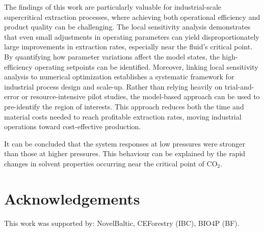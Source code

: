 \documentclass[a4paper,fleqn]{cas-dc}
\begin{document}
	{\color{blue}The findings of this work are particularly valuable for industrial-scale supercritical extraction processes, where achieving both operational efficiency and product quality can be challenging. The local sensitivity analysis demonstrates that even small adjustments in operating parameters can yield disproportionately large improvements in extraction rates, especially near the fluid’s critical point. By quantifying how parameter variations affect the model states, the high-efficiency operating setpoints can be identified. Moreover, linking local sensitivity analysis to numerical optimization establishes a systematic framework for industrial process design and scale-up. Rather than relying heavily on trial-and-error or resource-intensive pilot studies, the model-based approach can be used to pre-identify the region of interests. This approach reduces both the time and material costs needed to reach profitable extraction rates, moving industrial operations toward cost-effective production.}
	
	It can be concluded that the system responses at low pressures were stronger than those at higher pressures. This behaviour can be explained by the rapid changes in solvent properties occurring near the critical point of CO$_2$.
	
	\section*{Acknowledgements} 
	This work was supported by: NovelBaltic, CEForestry (IBC), BIO4P (BF).
	
	
	
	
	\clearpage
	
\end{document}
